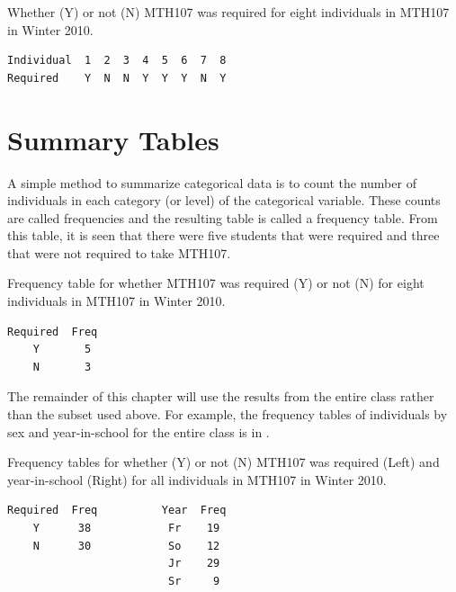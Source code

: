 \documentclass[10pt,openany]{book}\usepackage[]{graphicx}\usepackage[]{color}
\begin{document}
\begin{table}[htbp]
  \caption{Whether (Y) or not (N) MTH107 was required for eight individuals in MTH107 in Winter 2010.}
  \label{tab:MTH107Subset}
  \centering
  \begin{Verbatim}[xleftmargin=10mm]
Individual  1  2  3  4  5  6  7  8
Required    Y  N  N  Y  Y  Y  N  Y
  \end{Verbatim}
\end{table}


\section{Summary Tables}
\vspace{-12pt}
A simple method to summarize categorical data is to count the number of individuals in each category (or level) of the categorical variable.  These counts are called frequencies and the resulting table  is called a frequency table.  From this table, it is seen that there were five students that were required and three that were not required to take MTH107.

\begin{table}[htbp]
  \caption{Frequency table for whether MTH107 was required (Y) or not (N) for eight individuals in MTH107 in Winter 2010.}
  \label{tab:MTH107SubsetFreq}
  \centering
  \begin{Verbatim}[xleftmargin=15mm]
Required  Freq
    Y       5
    N       3
  \end{Verbatim}
\end{table}

\vspace{-12pt}

The remainder of this chapter will use the results from the entire class rather than the subset used above.  For example, the frequency tables of individuals by sex and year-in-school for the entire class is in .

\begin{table}[htbp]
  \caption{Frequency tables for whether (Y) or not (N) MTH107 was required (Left) and year-in-school (Right) for all individuals in MTH107 in Winter 2010.}
  \label{tab:Mth107Freq}
  \centering
  \begin{Verbatim}[xleftmargin=15mm]
Required  Freq          Year  Freq
    Y      38            Fr    19
    N      30            So    12
                         Jr    29
                         Sr     9
   \end{Verbatim}
\end{table}
\end{document}
